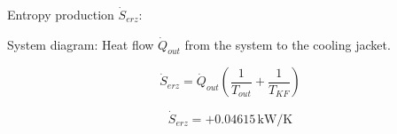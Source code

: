 Entropy production \( \dot{S}_{erz} \):  

System diagram:  
Heat flow \( \dot{Q}_{out} \) from the system to the cooling jacket.  

\[ \dot{S}_{erz} = \dot{Q}_{out} \left( \frac{1}{T_{out}} + \frac{1}{T_{KF}} \right) \]  

\[ \dot{S}_{erz} = +0.04615 \, \text{kW/K} \]